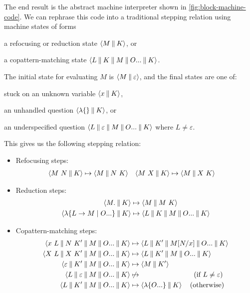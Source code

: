 \documentclass[sigplan,screen]{acmart}
\begin{document}
The end result is the abstract machine interpreter shown in
\cref{fig:block-machine-code}.  We can rephrase this code into a traditional
stepping relation using machine states of forms
\begin{enumerate*}[(1)]
\item a refocusing or reduction state $\cut{M}{K}$, or
\item a copattern-matching state
  $\braket{L \cmid K \cmid M \cmid \many{O} \cmid K}$.
\end{enumerate*}
The initial state for evaluating $M$ is $\cut{M}{\varepsilon}$, and the final
states are one of:
\begin{enumerate*}[(1)]
\item stuck on an unknown variable $\cut{x}{K}$,
\item an unhandled question $\cut{\lambda\{\}}{K}$, or
\item an underspecified question
  $\braket{L \cmid \varepsilon \cmid M \cmid \many{O} \cmid K}$ where $L \neq \varepsilon$.
\end{enumerate*}
This gives us the following stepping relation:
\begin{itemize}
\item Refocusing steps:
\begin{align*}
  \cut{M~N}{K}
  &\mapsto
  \cut{M}{N ~ K}
  &
  \cut{M~X}{K}
  &\mapsto
  \cut{M}{X ~ K}
\end{align*}

\item Reduction steps:
  \begin{align*}
  \cut{M.}{K}
  &\mapsto
  \cut{M}{M ~ K}
  \\
  \cut{\lambda\{L \to M \mid \many{O}\}}{K}
  &\mapsto
  \braket{L \cmid K \cmid M \cmid \many{O} \cmid K}
\end{align*}

\item Copattern-matching steps:
\begin{align*}
  \braket{x ~ L \cmid N ~ K' \cmid M \cmid \many{O} \cmid K}
  &\mapsto
  \braket{L \cmid K' \cmid M\subst{x}{N} \cmid \many{O} \cmid K}
  \\
  \braket{X ~ L \cmid X ~ K' \cmid M \cmid \many{O} \cmid K}
  &\mapsto
  \braket{L \cmid K' \cmid M \cmid \many{O} \cmid K}
  \\
  \braket{\varepsilon \cmid K' \cmid M \cmid \many{O} \cmid K}
  &\mapsto
  \cut{M}{K'}
  \\
  \braket{L \cmid \varepsilon \cmid M \cmid \many{O} \cmid K}
  &\not\mapsto
  \qquad\qquad\qquad\quad\;\;
  (\text{if } L \neq \varepsilon)
  \\
  \braket{L \cmid K' \cmid M \cmid \many{O} \cmid K}
  &\mapsto
  \cut{\lambda\{\many{O}\}}{K}
  \quad(\text{otherwise})
\end{align*}
\end{itemize}
\end{document}
